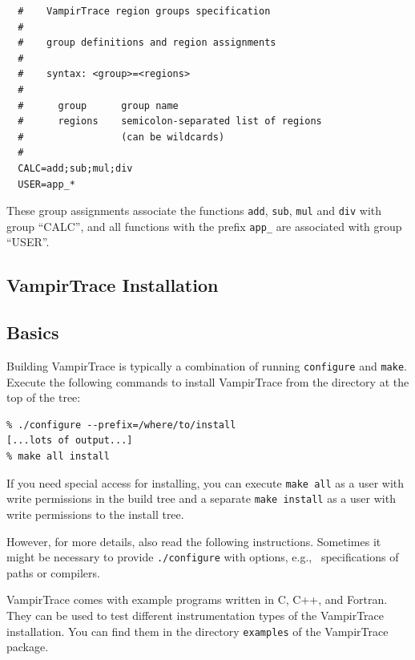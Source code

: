 \documentclass[a4paper,twoside,12pt,BCOR12mm]{scrbook}
\newcommand{\pathname}[1]{\nolinkurl{#1}}  %
\renewcommand{\pathname}[1]{\texttt{#1}}   %
\begin{document}
\begin{verbatim}
  #    VampirTrace region groups specification
  #
  #    group definitions and region assignments
  #
  #    syntax: <group>=<regions>
  #
  #      group      group name 
  #      regions    semicolon-separated list of regions
  #                 (can be wildcards)
  #
  CALC=add;sub;mul;div
  USER=app_*
\end{verbatim} 

These group assignments associate the functions \texttt{add}, \texttt{sub}, 
\texttt{mul} and \texttt{div} with group ``CALC'', and all functions 
with the prefix \texttt{app\_} are associated with group ``USER''.



\appendix
\begin{latexonly}

\chapter{VampirTrace Installation}
\label{chap:install}


\section{Basics}

    Building VampirTrace is typically a combination of running \texttt{configure}
    and\latex{\linebreak} \texttt{make}.  Execute the following commands to install VampirTrace from
    the directory at the top of the tree:

\begin{verbatim}
% ./configure --prefix=/where/to/install
[...lots of output...]
% make all install
\end{verbatim} 

    If you need special access for installing, you can execute
    \texttt{make all} as a user with write permissions in the build tree and a
    separate \texttt{make install} as a user with write permissions to the
    install tree.

    However, for more details, also read the following instructions. Sometimes
    it might be necessary to provide \texttt{./configure} with options, e.g.,~
    specifications of paths or compilers.
    
    VampirTrace comes with example programs written in C, C++, and Fortran.
    They can be used to test different instrumentation types of the
    VampirTrace installation.
    You can find them in the directory \pathname{examples} of the VampirTrace package.
    

\end{latexonly}
\end{document}
